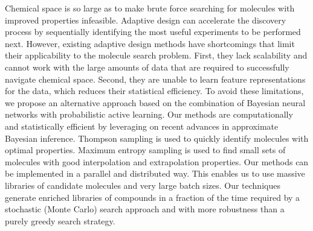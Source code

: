 
Chemical space is so large as to make brute force searching for molecules with
improved properties infeasible. Adaptive design can accelerate the discovery
process by sequentially identifying the most useful experiments to be performed
next. However, existing adaptive design methods have shortcomings that limit
their applicability to the molecule search problem. First, they lack
scalability and cannot work with the large amounts of data that are required to
successfully navigate chemical space. Second, they are unable to learn feature
representations for the data, which reduces their statistical efficiency. To
avoid these limitations, we propose an alternative approach based on the
combination of Bayesian neural networks with probabilistic active learning. Our
methods are computationally and statistically efficient by leveraging on recent
advances in approximate Bayesian inference. Thompson
sampling is used to quickly identify molecules with optimal properties.
Maximum entropy sampling is used
to find small sets of molecules with good interpolation and extrapolation properties.
Our methods can be implemented in a parallel and distributed way. This enables us to use
massive libraries of candidate molecules and very large batch sizes.
Our techniques generate enriched libraries of compounds in a fraction
of the time required by a stochastic (Monte Carlo) search approach and with
more robustness than a purely greedy search strategy.